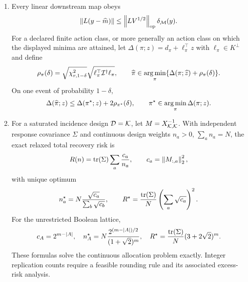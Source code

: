 \begin{theorem}
\begin{enumerate}[leftmargin=*,itemsep=4pt,label=(\roman*)]
\[
b_\parallel=\mathcal I^\dagger A^*V^{-1}b,
\qquad
b_\perp=(I-\Pi_A)V^{-1/2}b.
\]
Omitted structure decomposes exactly into estimation bias and orthogonal lack of fit:
\begin{equation}
\EE\norm{\widehat z-z}^2=\norm{b_\parallel}^2+\tr(\mathcal I^\dagger),
\qquad
\norm{(I-\Pi_A)V^{-1/2}Y}^2\sim\chi^2_{n-r}(\norm{b_\perp}^2).
\label{eq:master-misspecification}
\end{equation}
\item Every linear downstream map obeys
\[
\left\lVert L(y-\widehat m)\right\rVert\le\left\lVert LV^{1/2}\right\rVert_{\mathrm{op}}\delta_{\mathcal M}(y).
\]
For a declared finite action class, or more generally an action class on which the displayed minima are attained, let $\Delta(\pi;z)=d_\pi+\ell_\pi^\top z$ with $\ell_\pi\in K^\perp$ and define
\[
\rho_\pi(\delta)=\sqrt{\chi^2_{r,1-\delta}}
\sqrt{\ell_\pi^\top\mathcal I^\dagger\ell_\pi},
\qquad
\widehat\pi\in\operatorname*{arg\,min}_\pi
\{\Delta(\pi;\widehat z)+\rho_\pi(\delta)\}.
\]
On one event of probability $1-\delta$,
\begin{equation}
\Delta(\widehat\pi;z)
\le\Delta(\pi^\star;z)+2\rho_{\pi^\star}(\delta),
\qquad
\pi^\star\in\operatorname*{arg\,min}_\pi\Delta(\pi;z).
\label{eq:master-action-oracle}
\end{equation}
\item For a saturated incidence design $\mathcal D=\mathcal K$, let $M=X_{\mathcal K,\mathcal K}^{-1}$.  With independent response covariance $\Sigma$ and continuous design weights $n_a>0$, $\sum_an_a=N$, the exact relaxed total recovery risk is
\begin{equation}
R(n)=\operatorname{tr}(\Sigma)\sum_a\frac{c_a}{n_a},
\qquad c_a=\left\lVert M_{:,a}\right\rVert_2^2,
\label{eq:exact-replication-risk}
\end{equation}
with unique optimum
\begin{equation}
n_a^\star=N\frac{\sqrt{c_a}}{\sum_b\sqrt{c_b}},
\qquad
R^\star=\frac{\operatorname{tr}(\Sigma)}{N}\left(\sum_a\sqrt{c_a}\right)^2.
\label{eq:exact-a-optimal-allocation}
\end{equation}
For the unrestricted Boolean lattice,
\begin{equation}
c_A=2^{m-|A|},
\quad
n_A^\star=N\frac{2^{(m-|A|)/2}}{(1+\sqrt2)^m},
\quad
R^\star=\frac{\operatorname{tr}(\Sigma)}{N}(3+2\sqrt2)^m.
\label{eq:boolean-exact-a-optimal-allocation}
\end{equation}
These formulas solve the continuous allocation problem exactly.  Integer replication counts require a feasible rounding rule and its associated excess-risk analysis.
\end{enumerate}
\end{theorem}

